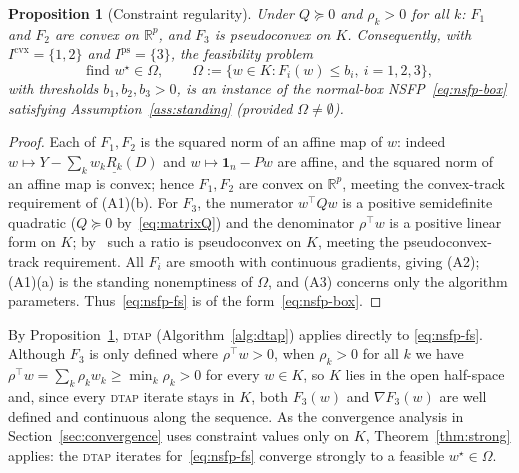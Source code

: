 \documentclass[]{interact}
\theoremstyle{plain}
\newtheorem{proposition}[theorem]{Proposition}
\theoremstyle{definition}
\theoremstyle{remark}
\newcommand{\R}{\mathbb{R}}
\newcommand{\cvx}{\mathrm{cvx}}
\newcommand{\ps}{\mathrm{ps}}
\newcommand{\dtap}{\textsc{dtap}}
\begin{document}
\begin{proposition}[Constraint regularity]\label{prop:fs-reg}
Under $Q\succeq0$ and $\rho_k>0$ for all $k$: $F_1$ and $F_2$ are convex on $\R^p$, and $F_3$ is pseudoconvex on $K$. Consequently, with $I^{\cvx}=\{1,2\}$ and $I^{\ps}=\{3\}$, the feasibility problem
\begin{equation}\label{eq:nsfp-fs}
\text{find } w^\star\in\Omega,\qquad \Omega:=\{w\in K:F_i(w)\le b_i,\ i=1,2,3\},
\end{equation}
with thresholds $b_1,b_2,b_3>0$, is an instance of the normal-box NSFP~\eqref{eq:nsfp-box} satisfying Assumption~\ref{ass:standing} (provided $\Omega\ne\emptyset$).
\end{proposition}
\begin{proof}
Each of $F_1,F_2$ is the squared norm of an affine map of $w$: indeed $w\mapsto Y-\sum_k w_k\underline{R_k}(D)$ and $w\mapsto\mathbf{1}_n-Pw$ are affine, and the squared norm of an affine map is convex; hence $F_1,F_2$ are convex on $\R^p$, meeting the convex-track requirement of (A1)(b). For $F_3$, the numerator $w^{\top}Qw$ is a positive semidefinite quadratic ($Q\succeq0$ by~\eqref{eq:matrixQ}) and the denominator $\rho^{\top}w$ is a positive linear form on $K$; by~\citep{wang2021fractional} such a ratio is pseudoconvex on $K$, meeting the pseudoconvex-track requirement. All $F_i$ are smooth with continuous gradients, giving (A2); (A1)(a) is the standing nonemptiness of $\Omega$, and (A3) concerns only the algorithm parameters. Thus~\eqref{eq:nsfp-fs} is of the form~\eqref{eq:nsfp-box}.
\end{proof}

By Proposition~\ref{prop:fs-reg}, \dtap{} (Algorithm~\ref{alg:dtap}) applies directly to \eqref{eq:nsfp-fs}. Although $F_3$ is only defined where $\rho^{\top}w>0$, when $\rho_k>0$ for all $k$ we have $\rho^{\top}w=\sum_k\rho_k w_k\ge\min_k\rho_k>0$ for every $w\in K$, so $K$ lies in the open half-space and, since every \dtap{} iterate stays in $K$, both $F_3(w)$ and $\nabla F_3(w)$ are well defined and continuous along the sequence. As the convergence analysis in Section~\ref{sec:convergence} uses constraint values only on $K$, Theorem~\ref{thm:strong} applies: the \dtap{} iterates for~\eqref{eq:nsfp-fs} converge strongly to a feasible $w^\star\in\Omega$.
\end{document}
